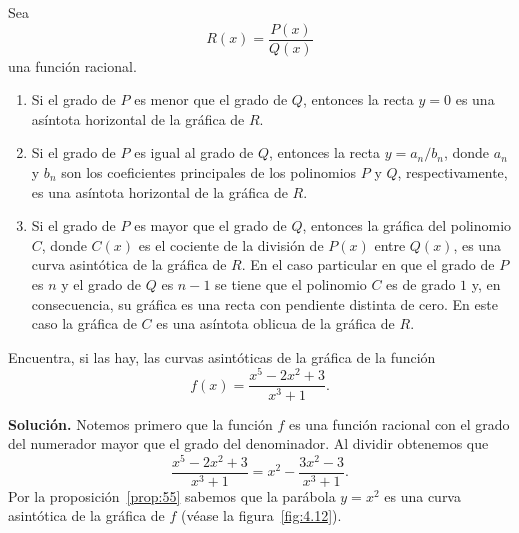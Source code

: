 \documentclass[12pt,a4paper]{book}
\begin{document}
    \begin{proposicion}\label{prop:55}
        Sea
        \begin{equation*}
            R(x)=\frac{P(x)}{Q(x)}
        \end{equation*}
        una función racional.
        \begin{enumerate}[nosep]
            \item Si el grado de $P$ es menor que el grado de $Q$, entonces la recta $y=0$ es
            una asíntota horizontal de la gráfica de $R$.
            \item Si el grado de $P$ es igual al grado de $Q$, entonces la recta $y=a_{n}/b_{n}$,
            donde $a_{n}$ y $b_{n}$ son los coeficientes principales de los polinomios $P$ y $Q$,
            respectivamente, es una asíntota horizontal de la gráfica de $R$.
            \item Si el grado de $P$ es mayor que el grado de $Q$, entonces la gráfica del polinomio
            $C$, donde $C(x)$ es el cociente de la división de $P(x)$ entre $Q(x)$,
            es una curva asintótica de la gráfica de $R$. En el caso particular en que el
            grado de $P$ es $n$ y el grado de $Q$ es $n-1$ se tiene que el polinomio $C$ es de
            grado $1$ y, en consecuencia, su gráfica es una recta con pendiente distinta
            de cero. En este caso la gráfica de $C$ es una asíntota oblicua de la gráfica
            de $R$.
        \end{enumerate}
    \end{proposicion}

    \begin{ejemplo}\label{ejm:67}
        Encuentra, si las hay, las curvas asintóticas
        de la gráfica de la función
        \begin{equation*}
            f(x)=\frac{x^{5}-2x^{2}+3}{x^{3}+1}.
        \end{equation*}

        \textbf{Solución.} Notemos primero que la función $f$ es una función racional con el
        grado del numerador mayor que el grado del denominador. Al dividir obtenemos
        que
        \begin{equation*}
            \frac{x^{5}-2x^{2}+3}{x^{3}+1}=x^{2}-\frac{3x^{2}-3}{x^{3}+1}.
        \end{equation*}
        Por la proposición~\ref{prop:55} sabemos que la parábola $y=x^{2}$ es una curva asintótica
        de la gráfica de $f$ (véase la figura~\ref{fig:4.12}).
    \end{ejemplo}
\end{document}
